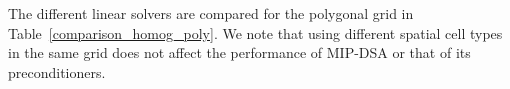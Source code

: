 \documentclass[preprint,10pt]{elsarticle}
\renewcommand{\(}{\left(}
\renewcommand{\)}{\right)}
\renewcommand{\[}{\left[}
\renewcommand{\]}{\right]}
\begin{document}
%
The different linear solvers are compared for the polygonal grid in Table~\ref {comparison_homog_poly}.
We note that using different spatial cell types in the same grid does not affect
the performance of MIP-DSA or that of its preconditioners.
\end{document}
